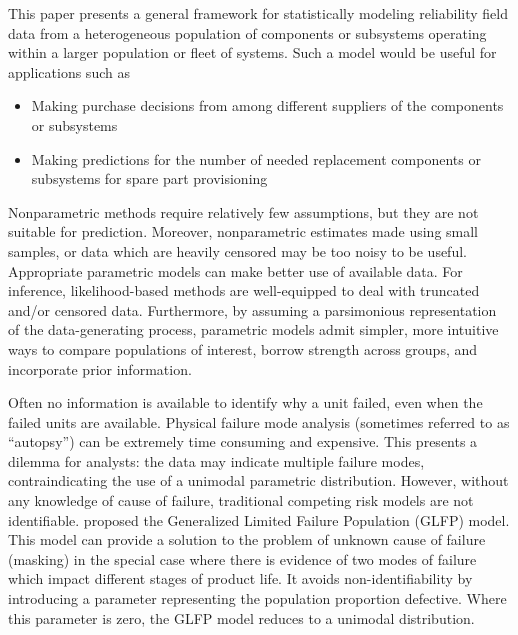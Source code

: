\documentclass[aoas]{imsart}
\begin{document}
This paper presents a general framework for statistically modeling reliability field data from a heterogeneous population of components or subsystems operating within a larger population or fleet of systems. Such a model would be useful for applications such as

\begin{itemize}
\item Making purchase decisions from among different suppliers of the components or subsystems
\item Making predictions for the number of needed replacement components or subsystems for spare part provisioning
\end{itemize}

Nonparametric methods require relatively few assumptions, but they are not suitable for prediction. Moreover, nonparametric estimates made using small samples, or data which are heavily censored may be too noisy to be useful. Appropriate parametric models can make better use of available data. For inference, likelihood-based methods are well-equipped to deal with truncated and/or censored data. Furthermore, by assuming a parsimonious representation of the data-generating process, parametric models admit simpler, more intuitive ways to compare populations of interest, borrow strength across groups, and incorporate prior information. 

Often no information is available to identify why a unit failed, even when the failed units are available. Physical failure mode analysis (sometimes referred to as ``autopsy'') can be extremely time consuming and expensive. This presents a dilemma for analysts: the data may indicate multiple failure modes, contraindicating the use of a unimodal parametric distribution. However, without any knowledge of cause of failure, traditional competing risk models are not identifiable. \citet{chan} proposed the Generalized Limited Failure Population (GLFP) model. This model can provide a solution to the problem of unknown cause of failure (masking) in the special case where there is evidence of two modes of failure which impact different stages of product life. It avoids non-identifiability by introducing a parameter representing the population proportion defective. Where this parameter is zero, the GLFP model reduces to a unimodal distribution. \\
\end{document}
